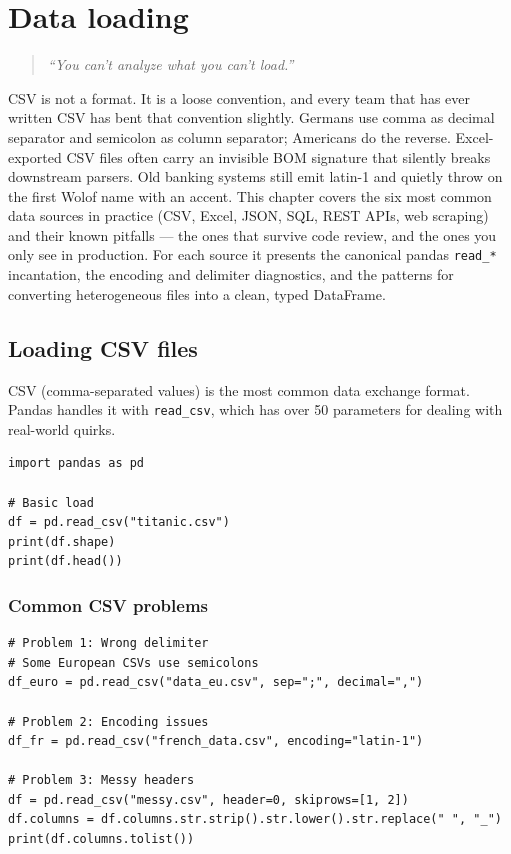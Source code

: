 \chapter{Data loading}
\label{ch:data-loading}

\begin{quote}
\emph{``You can't analyze what you can't load.''}
\end{quote}

CSV is not a format. It is a loose convention, and every team that has ever written CSV has bent that convention slightly. Germans use comma as decimal separator and semicolon as column separator; Americans do the reverse. Excel-exported CSV files often carry an invisible BOM signature that silently breaks downstream parsers. Old banking systems still emit latin-1 and quietly throw on the first Wolof name with an accent. This chapter covers the six most common data sources in practice (CSV, Excel, JSON, SQL, REST APIs, web scraping) and their known pitfalls --- the ones that survive code review, and the ones you only see in production. For each source it presents the canonical pandas \texttt{read\_*} incantation, the encoding and delimiter diagnostics, and the patterns for converting heterogeneous files into a clean, typed DataFrame.

\section{Loading CSV files}

CSV (comma-separated values) is the most common data exchange format. Pandas handles it with \texttt{read\_csv}, which has over 50 parameters for dealing with real-world quirks.

\begin{verbatim}
import pandas as pd

# Basic load
df = pd.read_csv("titanic.csv")
print(df.shape)
print(df.head())
\end{verbatim}

\subsection{Common CSV problems}

\begin{verbatim}
# Problem 1: Wrong delimiter
# Some European CSVs use semicolons
df_euro = pd.read_csv("data_eu.csv", sep=";", decimal=",")

# Problem 2: Encoding issues
df_fr = pd.read_csv("french_data.csv", encoding="latin-1")

# Problem 3: Messy headers
df = pd.read_csv("messy.csv", header=0, skiprows=[1, 2])
df.columns = df.columns.str.strip().str.lower().str.replace(" ", "_")
print(df.columns.tolist())
\end{verbatim}


